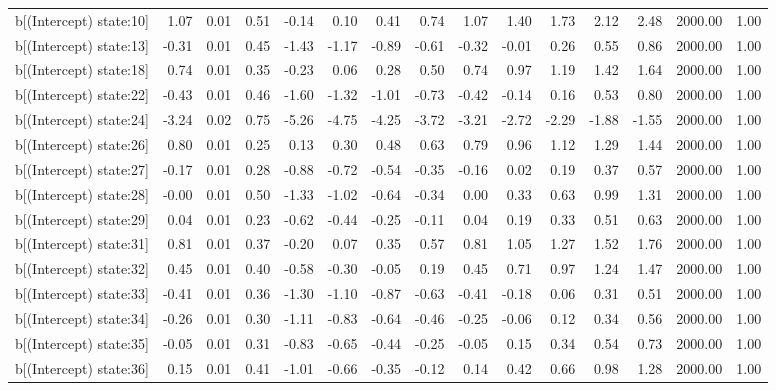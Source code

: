 \begin{table}[ht]
\begin{tabular}{rrrrrrrrrrrrrrr}
  b[(Intercept) state:10] & 1.07 & 0.01 & 0.51 & -0.14 & 0.10 & 0.41 & 0.74 & 1.07 & 1.40 & 1.73 & 2.12 & 2.48 & 2000.00 & 1.00 \\ 
  b[(Intercept) state:13] & -0.31 & 0.01 & 0.45 & -1.43 & -1.17 & -0.89 & -0.61 & -0.32 & -0.01 & 0.26 & 0.55 & 0.86 & 2000.00 & 1.00 \\ 
  b[(Intercept) state:18] & 0.74 & 0.01 & 0.35 & -0.23 & 0.06 & 0.28 & 0.50 & 0.74 & 0.97 & 1.19 & 1.42 & 1.64 & 2000.00 & 1.00 \\ 
  b[(Intercept) state:22] & -0.43 & 0.01 & 0.46 & -1.60 & -1.32 & -1.01 & -0.73 & -0.42 & -0.14 & 0.16 & 0.53 & 0.80 & 2000.00 & 1.00 \\ 
  b[(Intercept) state:24] & -3.24 & 0.02 & 0.75 & -5.26 & -4.75 & -4.25 & -3.72 & -3.21 & -2.72 & -2.29 & -1.88 & -1.55 & 2000.00 & 1.00 \\ 
  b[(Intercept) state:26] & 0.80 & 0.01 & 0.25 & 0.13 & 0.30 & 0.48 & 0.63 & 0.79 & 0.96 & 1.12 & 1.29 & 1.44 & 2000.00 & 1.00 \\ 
  b[(Intercept) state:27] & -0.17 & 0.01 & 0.28 & -0.88 & -0.72 & -0.54 & -0.35 & -0.16 & 0.02 & 0.19 & 0.37 & 0.57 & 2000.00 & 1.00 \\ 
  b[(Intercept) state:28] & -0.00 & 0.01 & 0.50 & -1.33 & -1.02 & -0.64 & -0.34 & 0.00 & 0.33 & 0.63 & 0.99 & 1.31 & 2000.00 & 1.00 \\ 
  b[(Intercept) state:29] & 0.04 & 0.01 & 0.23 & -0.62 & -0.44 & -0.25 & -0.11 & 0.04 & 0.19 & 0.33 & 0.51 & 0.63 & 2000.00 & 1.00 \\ 
  b[(Intercept) state:31] & 0.81 & 0.01 & 0.37 & -0.20 & 0.07 & 0.35 & 0.57 & 0.81 & 1.05 & 1.27 & 1.52 & 1.76 & 2000.00 & 1.00 \\ 
  b[(Intercept) state:32] & 0.45 & 0.01 & 0.40 & -0.58 & -0.30 & -0.05 & 0.19 & 0.45 & 0.71 & 0.97 & 1.24 & 1.47 & 2000.00 & 1.00 \\ 
  b[(Intercept) state:33] & -0.41 & 0.01 & 0.36 & -1.30 & -1.10 & -0.87 & -0.63 & -0.41 & -0.18 & 0.06 & 0.31 & 0.51 & 2000.00 & 1.00 \\ 
  b[(Intercept) state:34] & -0.26 & 0.01 & 0.30 & -1.11 & -0.83 & -0.64 & -0.46 & -0.25 & -0.06 & 0.12 & 0.34 & 0.56 & 2000.00 & 1.00 \\ 
  b[(Intercept) state:35] & -0.05 & 0.01 & 0.31 & -0.83 & -0.65 & -0.44 & -0.25 & -0.05 & 0.15 & 0.34 & 0.54 & 0.73 & 2000.00 & 1.00 \\ 
  b[(Intercept) state:36] & 0.15 & 0.01 & 0.41 & -1.01 & -0.66 & -0.35 & -0.12 & 0.14 & 0.42 & 0.66 & 0.98 & 1.28 & 2000.00 & 1.00 \\ 

\end{tabular}
\end{table}
